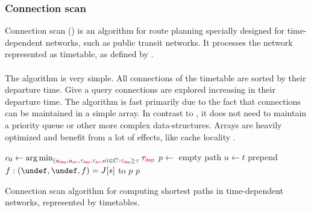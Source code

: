 \subsubsection{Connection scan}\label{csa}
	Connection scan (\csa)  is an algorithm for route planning specially designed for time-dependent networks,
	such as public transit networks. It processes the network represented as timetable, as defined by .\\\\
	The algorithm is very simple. All connections of the timetable are sorted by their departure time.
	Give a query connections are explored increasing in their departure time. The algorithm is fast primarily due to the fact that
	connections can be maintained in a simple array. In contrast to \dijkstra, it does not need to maintain a priority queue or
	other more complex data-structures. Arrays are heavily optimized and benefit from a lot of effects, like cache locality .
	\IncMargin{1em}
	\begin{algorithm}
		\BlankLine
		\BlankLine
		\BlankLine
		\BlankLine
		$c_0 \leftarrow \operatorname*{arg\,min}_{(u_{\textcolor{magenta}{\textsf{dep}}}, u_{\textcolor{magenta}{\textsf{arr}}}, \tau_{\textcolor{magenta}{\textsf{dep}}}, \tau_{\textcolor{magenta}{\textsf{arr}}}, o) \in C : \tau_{\textcolor{magenta}{\textsf{dep}}} \ge \tau} \tau_{\textcolor{magenta}{\textsf{dep}}}$\;
		\BlankLine
		$p \leftarrow$ empty path\;
		$u \leftarrow t$\;
		prepend $f : (\undef, \undef, f) = J[s]$ to $p$\;
		\Return $p$\;
		\BlankLine
		\caption{Connection scan algorithm for computing shortest paths in time-dependent networks, represented by timetables.}\label{csa_algo}
	\end{algorithm}\DecMargin{1em}\quad\\\\
